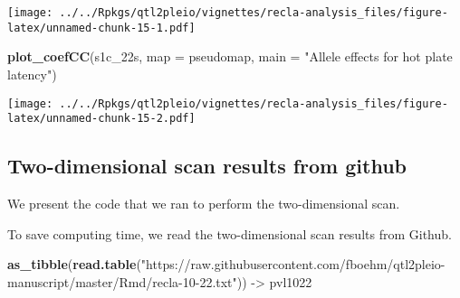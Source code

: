 \documentclass[oneside]{book}
\newenvironment{Shaded}{\begin{snugshade}}{\end{snugshade}}
\newcommand{\DataTypeTok}[1]{\textcolor[rgb]{0.13,0.29,0.53}{#1}}
\newcommand{\DecValTok}[1]{\textcolor[rgb]{0.00,0.00,0.81}{#1}}
\newcommand{\KeywordTok}[1]{\textcolor[rgb]{0.13,0.29,0.53}{\textbf{#1}}}
\newcommand{\NormalTok}[1]{#1}
\newcommand{\OperatorTok}[1]{\textcolor[rgb]{0.81,0.36,0.00}{\textbf{#1}}}
\newcommand{\StringTok}[1]{\textcolor[rgb]{0.31,0.60,0.02}{#1}}
\begin{document}
\texttt{[image: ../../Rpkgs/qtl2pleio/vignettes/recla-analysis\_files/figure-latex/unnamed-chunk-15-1.pdf]}

\begin{Shaded}
\begin{Highlighting}[]
\KeywordTok{plot_coefCC}\NormalTok{(s1c_22s, }\DataTypeTok{map =}\NormalTok{ pseudomap, }\DataTypeTok{main =} \StringTok{"Allele effects for hot plate latency"}\NormalTok{)}
\end{Highlighting}
\end{Shaded}

\texttt{[image: ../../Rpkgs/qtl2pleio/vignettes/recla-analysis\_files/figure-latex/unnamed-chunk-15-2.pdf]}

\hypertarget{two-dimensional-scan-results-from-github}{%
\subsection{Two-dimensional scan results from
github}\label{two-dimensional-scan-results-from-github}}

We present the code that we ran to perform the two-dimensional scan.

\begin{Shaded}
\end{Shaded}

To save computing time, we read the two-dimensional scan results from
Github.

\begin{Shaded}
\begin{Highlighting}[]
\KeywordTok{as_tibble}\NormalTok{(}\KeywordTok{read.table}\NormalTok{(}\StringTok{"https://raw.githubusercontent.com/fboehm/qtl2pleio-manuscript/master/Rmd/recla-10-22.txt"}\NormalTok{)) ->}\StringTok{ }\NormalTok{pvl1022}
\end{Highlighting}
\end{Shaded}
\end{document}
